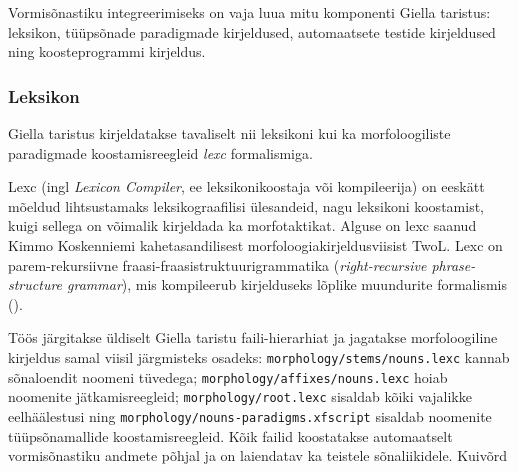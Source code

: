 \documentclass[12pt,a4paper]{article}
\begin{document}
Vormisõnastiku integreerimiseks on vaja luua mitu komponenti Giella taristus: leksikon, tüüpsõnade paradigmade kirjeldused, automaatsete testide kirjeldused ning kooste\-programmi kirjeldus. 





\subsubsection{Leksikon}
\label{sec:giella-leksikon}


Giella taristus kirjeldatakse tavaliselt nii leksikoni kui ka morfoloogiliste paradigmade koostamis\-reegleid \textit{lexc} formalismiga.

Lexc (ingl \textit{Lexicon Compiler}, ee leksikoni\-koostaja või kompileerija) on eeskätt mõeldud lihtsustamaks leksikograafilisi ülesandeid, nagu leksikoni koostamist, kuigi sellega on võimalik kirjeldada ka morfotaktikat. 
Alguse on lexc saanud Kimmo Koskenniemi kahetasandilisest morfoloogia\-kirjeldus\-viisist TwoL. 
Lexc on parem-rekursiivne fraasi-fraasi\-struktuuri\-grammatika (\textit{right-recursive phrase-structure grammar}), mis kompileerub kirjelduseks lõplike muundurite formalismis (\cites[]{karttunen_finite-state_1993}[203]{beesley_finite_2003}). 

Töös järgitakse üldiselt Giella taristu faili-hierarhiat ja jagatakse morfoloogiline kirjeldus samal viisil järgmisteks osadeks: \texttt{morphology/stems/nouns.lexc} kannab sõna\-loendit noomeni tüvedega; \texttt{morphology/affixes/nouns.lexc} hoiab noomenite jätkamis\-reegleid; \texttt{morphology/root.lexc} sisaldab kõiki vajalikke eel\-häälestusi ning \texttt{morphology/nouns-paradigms.xfscript} sisaldab noomenite tüüpsõna\-mallide koostamis\-reegleid. Kõik failid koostatakse automaatselt vormi\-sõnastiku andmete põhjal ja on laiendatav ka teistele sõna\-liikidele. Kuivõrd 
\end{document}
